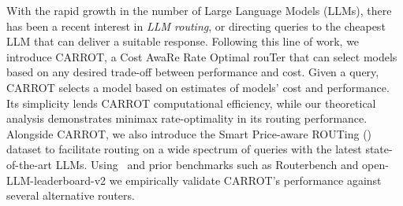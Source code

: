 With the rapid growth in the number of Large Language Models (LLMs), there has been a recent interest in \emph{LLM routing}, or directing queries to the cheapest LLM that can deliver a suitable response. 
Following this line of work, we introduce CARROT, a Cost AwaRe Rate Optimal rouTer that can select models based on any desired trade-off between performance and cost. Given a query, CARROT selects a model based on estimates of models' cost and performance. Its simplicity lends CARROT computational efficiency, while our theoretical analysis demonstrates minimax rate-optimality in its routing performance. Alongside CARROT, we also introduce the Smart Price-aware ROUTing (\newdata) dataset to facilitate routing on a wide spectrum of queries with the latest state-of-the-art LLMs. Using \newdata\ and prior benchmarks such as Routerbench and open-LLM-leaderboard-v2 we empirically validate CARROT's performance against several alternative routers.